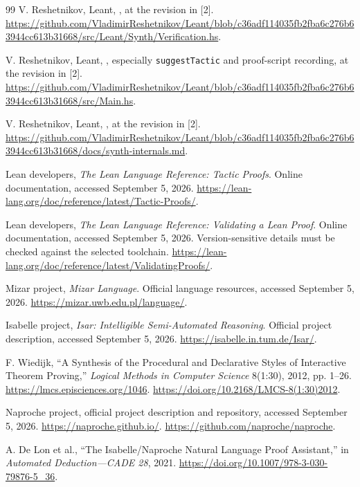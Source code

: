 \documentclass[11pt,a4paper]{article}
\newcommand{\code}[1]{\texttt{\small #1}}
\theoremstyle{definition}
\theoremstyle{remark}
\begin{document}
\begin{thebibliography}{99}
V. Reshetnikov, Leant, , at the revision in [2].
\url{https://github.com/VladimirReshetnikov/Leant/blob/c36adf114035fb2fba6c276b63944cc613b31668/src/Leant/Synth/Verification.hs}.

V. Reshetnikov, Leant, , especially \code{suggestTactic} and proof-script recording, at the revision in [2].
\url{https://github.com/VladimirReshetnikov/Leant/blob/c36adf114035fb2fba6c276b63944cc613b31668/src/Main.hs}.

V. Reshetnikov, Leant, , at the revision in [2].
\url{https://github.com/VladimirReshetnikov/Leant/blob/c36adf114035fb2fba6c276b63944cc613b31668/docs/synth-internals.md}.

Lean developers, \emph{The Lean Language Reference: Tactic Proofs}. Online documentation, accessed September 5, 2026.
\url{https://lean-lang.org/doc/reference/latest/Tactic-Proofs/}.

Lean developers, \emph{The Lean Language Reference: Validating a Lean Proof}. Online documentation, accessed September 5, 2026. Version-sensitive details must be checked against the selected toolchain.
\url{https://lean-lang.org/doc/reference/latest/ValidatingProofs/}.

Mizar project, \emph{Mizar Language}. Official language resources, accessed September 5, 2026.
\url{https://mizar.uwb.edu.pl/language/}.

Isabelle project, \emph{Isar: Intelligible Semi-Automated Reasoning}. Official project description, accessed September 5, 2026.
\url{https://isabelle.in.tum.de/Isar/}.

F. Wiedijk, ``A Synthesis of the Procedural and Declarative Styles of Interactive Theorem Proving,'' \emph{Logical Methods in Computer Science} 8(1:30), 2012, pp. 1--26.
\url{https://lmcs.episciences.org/1046}.
\url{https://doi.org/10.2168/LMCS-8(1:30)2012}.

Naproche project, official project description and repository, accessed September 5, 2026.
\url{https://naproche.github.io/}.
\url{https://github.com/naproche/naproche}.

A. De Lon et al., ``The Isabelle/Naproche Natural Language Proof Assistant,'' in \emph{Automated Deduction---CADE 28}, 2021.
\url{https://doi.org/10.1007/978-3-030-79876-5_36}.


\end{thebibliography}
\end{document}
